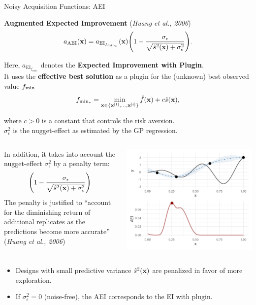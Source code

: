 \documentclass[11pt,compress,t,notes=noshow, xcolor=table]{beamer}
\begin{document}
\begin{vbframe}{Noisy Acquisition Functions: AEI}


\textbf{Augmented Expected Improvement} (\emph{Huang et al., 2006})
$$
  a_{\text{AEI}}(\mathbf{x}) = a_{\text{EI}_{f_{\min_*}}}(\mathbf{x}) \Bigg(1- \frac{\sigma_{\epsilon}}{\sqrt{\hat{s}^2(\mathbf{x})+ \sigma_{\epsilon}^{2}}}\Bigg).
$$

Here, $a_{\text{EI}_{f_{\min_*}}}$ denotes the \textbf{Expected Improvement with Plugin}.\\
It uses the \textbf{effective best solution} as a plugin for the (unknown) best observed value $f_{\min}$
$$
  f_{\min_*} = \min_{\mathbf{x} \in \{\mathbf{x}^{[1]}, ..., \mathbf{x}^{[t]}\}} \hat{f}(\mathbf{x}) + c \hat{s}(\mathbf{x}),
$$

where $c > 0$ is a constant that controls the risk aversion.\\
\vspace{1em}
$\sigma_{\epsilon}^{2}$ is the nugget-effect as estimated by the GP regression.


\framebreak
\begin{columns}[T]
\begin{column}{0.5\textwidth}
In addition, it takes into account the nugget-effect $\sigma_{\epsilon}^{2}$ by a penalty term:
$$
  \Bigg(1- \frac{\sigma_\epsilon}{\sqrt{\hat{s}^2(\mathbf{x})+ \sigma_\epsilon^2}}\Bigg)
$$
The penalty is justified to \enquote{account for the diminishing return of additional replicates as the predictions become more accurate} (\emph{Huang et al., 2006})
\end{column}
\begin{column}{0.5\textwidth}
  \includegraphics[width = \textwidth]{figure_man/noisy_3.png}
\end{column}
\end{columns}
\vfill
\begin{itemize}
  \item Designs with small predictive variance $\hat{s}^2(\mathbf{x})$ are penalized in favor of more exploration.
  \item If $\sigma_\epsilon^2 = 0$ (noise-free), the AEI corresponds to the EI with plugin. 
\end{itemize}

\end{vbframe}
\end{document}
